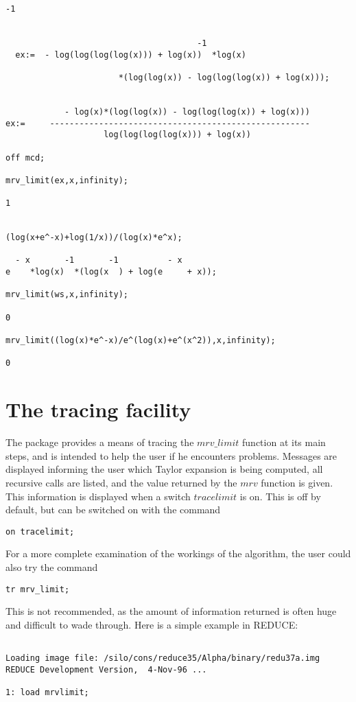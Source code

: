 {\begin{verbatim}
-1


                                       -1
  ex:=  - log(log(log(log(x))) + log(x))  *log(x)

                       *(log(log(x)) - log(log(log(x)) + log(x)));


            - log(x)*(log(log(x)) - log(log(log(x)) + log(x)))
ex:=     -----------------------------------------------------
                    log(log(log(log(x))) + log(x))

off mcd;

mrv_limit(ex,x,infinity);

1


(log(x+e^-x)+log(1/x))/(log(x)*e^x);

  - x       -1       -1          - x
e    *log(x)  *(log(x  ) + log(e     + x));

mrv_limit(ws,x,infinity);

0

mrv_limit((log(x)*e^-x)/e^(log(x)+e^(x^2)),x,infinity);

0

\end{verbatim}
\normalsize
\section{The tracing facility}
The package provides a means of tracing the $mrv\_limit$ function at its main steps, and is intended to help the user if he encounters problems. Messages are displayed informing the user which Taylor expansion is being computed, all recursive calls are listed, and the value returned by the $mrv$ function is given. This information is displayed when  a switch $tracelimit$ is on. This is off by default, but can be switched on with the command
\begin{verbatim}
on tracelimit;
\end{verbatim}
For a more complete examination of the workings of the algorithm, the user could also try the command
\begin{verbatim}
tr mrv_limit;
\end{verbatim}
This is not recommended, as the amount of information returned is often huge and difficult to wade through.
Here is a simple example in \small{REDUCE}:
\begin{verbatim}

Loading image file: /silo/cons/reduce35/Alpha/binary/redu37a.img
REDUCE Development Version,  4-Nov-96 ...

1: load mrvlimit;


\end{verbatim}}
